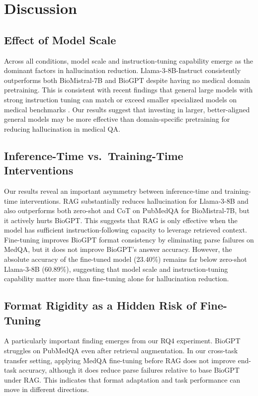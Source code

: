 \documentclass[11pt]{article}
\begin{document}
\section{Discussion}
 
\subsection{Effect of Model Scale}
Across all conditions, model scale and instruction-tuning capability 
emerge as the dominant factors in hallucination reduction. 
Llama-3-8B-Instruct consistently outperforms both BioMistral-7B and 
BioGPT despite having no medical domain pretraining. This is consistent 
with recent findings that general large models with strong instruction 
tuning can match or exceed smaller specialized models on medical 
benchmarks \cite{singhal2023large}. Our results suggest that investing 
in larger, better-aligned general models may be more effective than 
domain-specific pretraining for reducing hallucination in medical QA.
 
\subsection{Inference-Time vs.\ Training-Time Interventions}
Our results reveal an important asymmetry between inference-time and 
training-time interventions. RAG substantially reduces hallucination for 
Llama-3-8B and also outperforms both zero-shot and CoT on PubMedQA for 
BioMistral-7B, but it actively hurts BioGPT. This suggests that RAG is 
only effective when the model has sufficient instruction-following 
capacity to leverage retrieved context. Fine-tuning improves BioGPT 
format consistency by eliminating parse failures on MedQA, but it does 
not improve BioGPT's answer accuracy. However, the absolute accuracy of 
the fine-tuned model (23.40\%) remains far below zero-shot Llama-3-8B 
(60.89\%), suggesting that model scale and instruction-tuning capability 
matter more than fine-tuning alone for hallucination reduction.
 
\subsection{Format Rigidity as a Hidden Risk of Fine-Tuning}
A particularly important finding emerges from our RQ4 experiment. 
BioGPT struggles on PubMedQA even after retrieval augmentation. In our 
cross-task transfer setting, applying MedQA fine-tuning before RAG does 
not improve end-task accuracy, although it does reduce parse failures 
relative to base BioGPT under RAG. This indicates that format adaptation 
and task performance can move in different directions.
\end{document}
